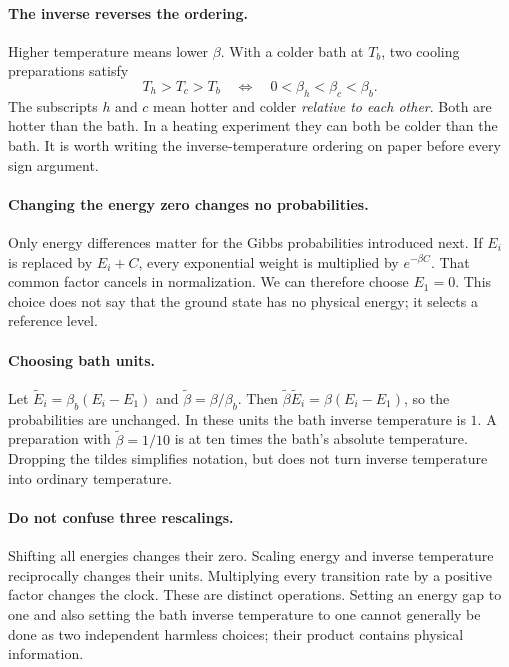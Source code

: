 \documentclass[11pt]{article}
\begin{document}
\paragraph{The inverse reverses the ordering.}
Higher temperature means lower $\beta$. With a colder bath at $T_b$, two
cooling preparations satisfy
\[
T_h>T_c>T_b
\quad\Longleftrightarrow\quad
0<\beta_h<\beta_c<\beta_b.
\]
The subscripts $h$ and $c$ mean hotter and colder \emph{relative to each other}.
Both are hotter than the bath. In a heating experiment they can both be colder
than the bath. It is worth writing the inverse-temperature ordering on paper
before every sign argument.

\paragraph{Changing the energy zero changes no probabilities.}
Only energy differences matter for the Gibbs probabilities introduced next.
If $E_i$ is replaced by $E_i+C$, every exponential weight is multiplied by
$e^{-\beta C}$. That common factor cancels in normalization. We can therefore
choose $E_1=0$. This choice does not say that the ground state has no physical
energy; it selects a reference level.

\paragraph{Choosing bath units.}
Let $\widetilde E_i=\beta_b(E_i-E_1)$ and
$\widetilde\beta=\beta/\beta_b$. Then
$\widetilde\beta\widetilde E_i=\beta(E_i-E_1)$, so the probabilities are
unchanged. In these units the bath inverse temperature is $1$. A preparation
with $\widetilde\beta=1/10$ is at ten times the bath's absolute temperature.
Dropping the tildes simplifies notation, but does not turn inverse temperature
into ordinary temperature.

\paragraph{Do not confuse three rescalings.}
Shifting all energies changes their zero. Scaling energy and inverse
temperature reciprocally changes their units. Multiplying every transition
rate by a positive factor changes the clock. These are distinct operations.
Setting an energy gap to one and also setting the bath inverse temperature to
one cannot generally be done as two independent harmless choices; their
product contains physical information.
\end{document}
